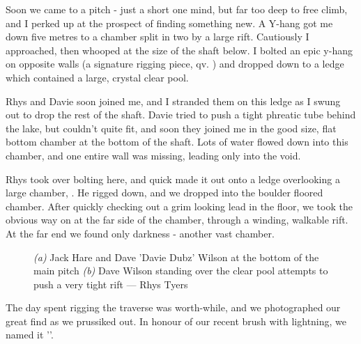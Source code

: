 Soon we came to a pitch - just a short one mind, but far too deep to free climb, and I perked up at the prospect of finding something new. A Y-hang got me down five metres to a chamber split in two by a large rift. Cautiously I approached, then whooped at the size of the shaft below. I bolted an epic y-hang on opposite walls (a signature rigging piece, qv. ) and dropped down to a ledge which contained a large, crystal clear pool.

Rhys and Davie soon joined me, and I stranded them on this ledge as I swung out to drop the rest of the shaft. Davie tried to push a tight phreatic tube behind the lake, but couldn’t quite fit, and soon they joined me in the good size, flat bottom chamber at the bottom of the shaft. Lots of water flowed down into this chamber, and one entire wall was missing, leading only into the void.

Rhys took over bolting here, and quick made it out onto a ledge overlooking a large chamber, . He rigged down, and we dropped into the boulder floored chamber. After quickly checking out a grim looking lead in the floor, we took the obvious way on at the far side of the chamber, through a winding, walkable rift. At the far end we found only darkness - another vast chamber.


\begin{figure}[t!]
\checkoddpage \ifoddpage \forcerectofloat \else \forceversofloat \fi
\centering
\begin{subfigure}{0.667\textwidth}
        \caption{}
\end{subfigure}\hfill
\begin{subfigure}{0.31\textwidth}
 \caption{}\label{Crystal pool}
\end{subfigure}
\caption{\emph{(a)} Jack Hare and Dave 'Davie Dubz' Wilson at the bottom of the \protect{} main pitch \emph{(b)} Dave Wilson standing over the clear pool attempts to push a very tight rift --- Rhys Tyers}
\label{new figure}
\end{figure}

The day spent rigging the traverse was worth-while, and we photographed our great find as we prussiked out. In honour of our recent brush with lightning, we named it ''. 




